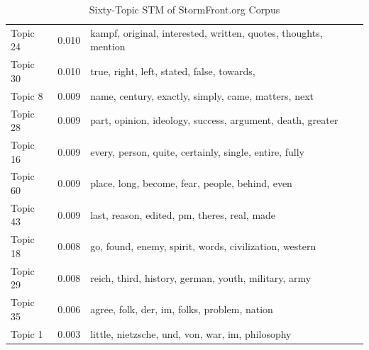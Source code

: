 \documentclass[12pt]{paper}
\begin{document}
\begin{table}[H]
\begin{adjustbox}{width=1\textwidth}
\begin{tabular}{lll}
			Topic 24                           & 0.010                                                  & kampf, original, interested, written, quotes, thoughts, mention     \\
			Topic 30                           & 0.010                                                  & true, right, left, stated, false, towards,                          \\
			Topic 8                            & 0.009                                                  & name, century, exactly, simply, came, matters, next                 \\
			Topic 28                           & 0.009                                                  & part, opinion, ideology, success, argument, death, greater          \\
			Topic 16                           & 0.009                                                  & every, person, quite, certainly, single, entire, fully              \\
			Topic 60                           & 0.009                                                  & place, long, become, fear, people, behind, even                     \\
			Topic 43                           & 0.009                                                  & last, reason, edited, pm, theres, real, made                        \\
			Topic 18                           & 0.008                                                  & go, found, enemy, spirit, words, civilization, western              \\
			Topic 29                           & 0.008                                                  & reich, third, history, german, youth, military, army                \\
			Topic 35                           & 0.006                                                  & agree, folk, der, im, folks, problem, nation                        \\
			Topic 1                            & 0.003                                                  & little, nietzsche, und, von, war, im, philosophy                   
		\end{tabular}
	\end{adjustbox}
	\caption{Sixty-Topic STM of StormFront.org Corpus} 
	\label{}
\end{table}
\end{document}
